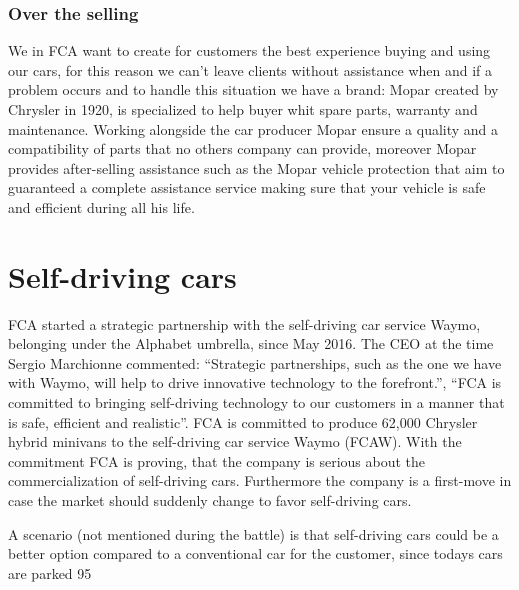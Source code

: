 \subsubsection{Over the selling}
We in FCA want to create for customers the best experience buying and using our cars, for this reason we can't leave clients without assistance when and if a problem occurs and to handle this situation we have a brand: Mopar \cite{Mopar} created by Chrysler in 1920, is specialized to help buyer whit spare parts, warranty and maintenance. Working alongside the car producer Mopar ensure a quality and a compatibility of parts that no others company can provide, moreover Mopar provides after-selling assistance such as the Mopar vehicle protection that aim to guaranteed a complete assistance service making sure that your vehicle is safe and efficient during all his life.


\section{Self-driving cars}

FCA started a strategic partnership with the self-driving car service Waymo, belonging under the Alphabet umbrella, since May 2016. The CEO at the time Sergio Marchionne commented: “Strategic partnerships, such as the one we have with Waymo, will help to drive innovative technology to the forefront.”, “FCA is committed to bringing self-driving technology to our customers in a manner that is safe, efficient and realistic”. FCA is committed to produce 62,000 Chrysler hybrid minivans to the self-driving car service Waymo (FCAW). With the commitment FCA is proving, that the company is serious about the commercialization of self-driving cars. Furthermore the company is a first-move in case the market should suddenly change to favor self-driving cars.

A scenario (not mentioned during the battle) is that self-driving cars could be a better option compared to a conventional car for the customer, since todays cars are parked 95%

